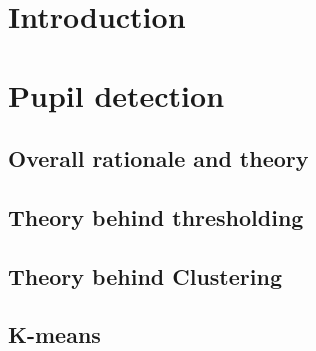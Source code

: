 \section{Introduction}

\section{Pupil detection}

\subsection{Overall rationale and theory}

\subsection{Theory behind thresholding}

\subsection{Theory behind Clustering}

\subsection{K-means}

